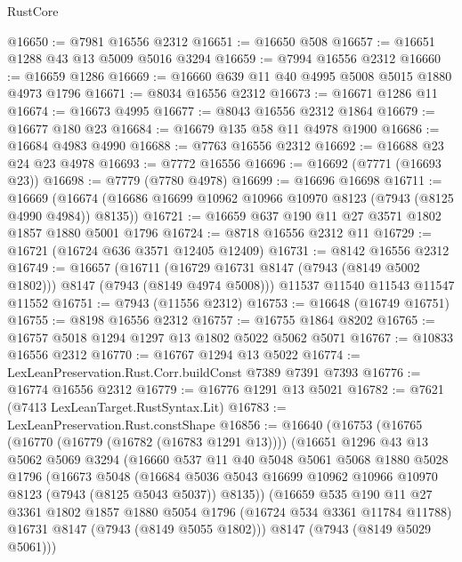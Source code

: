 \begin{lexlean}{RustCore}
\begin{coremodule}
@16650 := @7981 @16556 @2312
@16651 := @16650 @508
@16657 := @16651 @1288 @43 @13 @5009 @5016 @3294
@16659 := @7994 @16556 @2312
@16660 := @16659 @1286
@16669 := @16660 @639 @11 @40 @4995 @5008 @5015 @1880 @4973 @1796
@16671 := @8034 @16556 @2312
@16673 := @16671 @1286 @11
@16674 := @16673 @4995
@16677 := @8043 @16556 @2312 @1864
@16679 := @16677 @180 @23
@16684 := @16679 @135 @58 @11 @4978 @1900
@16686 := @16684 @4983 @4990
@16688 := @7763 @16556 @2312
@16692 := @16688 @23 @24 @23 @4978
@16693 := @7772 @16556
@16696 := @16692 (@7771 (@16693 @23))
@16698 := @7779 (@7780 @4978)
@16699 := @16696 @16698
@16711 := @16669
    (@16674 (@16686 @16699 @10962 @10966 @10970 @8123 (@7943 (@8125 @4990 @4984)) @8135))
@16721 := @16659 @637 @190 @11 @27 @3571 @1802 @1857 @1880 @5001 @1796
@16724 := @8718 @16556 @2312 @11
@16729 := @16721 (@16724 @636 @3571 @12405 @12409)
@16731 := @8142 @16556 @2312
@16749 := @16657
    (@16711 (@16729 @16731 @8147 (@7943 (@8149 @5002 @1802))) @8147 (@7943 (@8149 @4974 @5008)))
    @11537
    @11540
    @11543
    @11547
    @11552
@16751 := @7943 (@11556 @2312)
@16753 := @16648 (@16749 @16751)
@16755 := @8198 @16556 @2312
@16757 := @16755 @1864 @8202
@16765 := @16757 @5018 @1294 @1297 @13 @1802 @5022 @5062 @5071
@16767 := @10833 @16556 @2312
@16770 := @16767 @1294 @13 @5022
@16774 := LexLeanPreservation.Rust.Corr.buildConst @7389 @7391 @7393
@16776 := @16774 @16556 @2312
@16779 := @16776 @1291 @13 @5021
@16782 := @7621 (@7413 LexLeanTarget.RustSyntax.Lit)
@16783 := LexLeanPreservation.Rust.constShape
@16856 := @16640
    (@16753
      (@16765
        (@16770 (@16779 (@16782 (@16783 @1291 @13))))
        (@16651
          @1296
          @43
          @13
          @5062
          @5069
          @3294
          (@16660
            @537
            @11
            @40
            @5048
            @5061
            @5068
            @1880
            @5028
            @1796
            (@16673
              @5048
              (@16684
                @5036
                @5043
                @16699
                @10962
                @10966
                @10970
                @8123
                (@7943 (@8125 @5043 @5037))
                @8135))
            (@16659
              @535
              @190
              @11
              @27
              @3361
              @1802
              @1857
              @1880
              @5054
              @1796
              (@16724 @534 @3361 @11784 @11788)
              @16731
              @8147
              (@7943 (@8149 @5055 @1802)))
            @8147
            (@7943 (@8149 @5029 @5061)))

\end{coremodule}
\end{lexlean}
